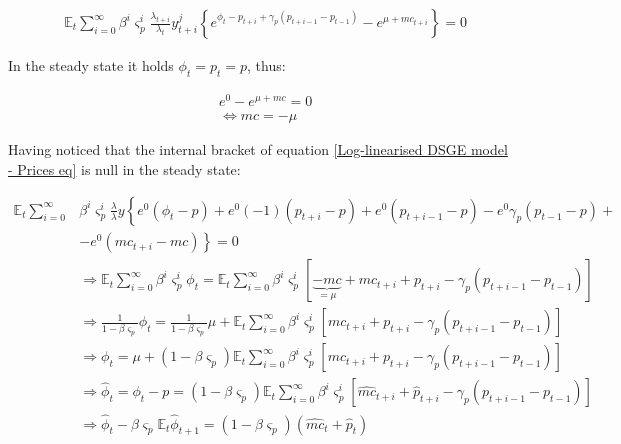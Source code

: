 \documentclass{pracamgr}
\numberwithin{equation}{section}
\begin{document}
\begin{align} \label{Log-linearised DSGE model - Prices eq}
&\mathbb{E}_{t}  \sum\limits_{i=0}^{\infty} \beta^{i} \varsigma_{p}^{i} \frac{\lambda_{t+i}}{\lambda_{t}} y_{t+i}^{j} \left\{ e^{\phi_{t} - p_{t+i} + \gamma_{p} \left(p_{t+i-1} - p_{t-1} \right) } - e^{\mu + mc_{t+i}} \right\} = 0
\end{align}

In the steady state it holds $\phi_{t} = p_{t} = p $, thus:

\begin{align}
& e^{0} - e^{\mu + mc} = 0 \nonumber \\
& \iff mc = -\mu
\end{align}

Having noticed that the internal bracket of equation \ref{Log-linearised DSGE model - Prices eq}  is null in the steady state:

\begin{align} \label{Log-linearised DSGE model - Prices eq2}
\mathbb{E}_{t}  \sum\limits_{i=0}^{\infty} &\beta^{i} \varsigma_{p}^{i} \frac{\lambda}{\lambda} y \left\{ e^{0} \left(\phi_{t} - p \right) + e^{0} (-1) \left(p_{t+i} - p \right) + e^{0} \left( p_{t+i-1} - p \right) - e^{0}\gamma_{p} \left(p_{t-1} - p \right) + \nonumber \right. \\
& \left. - e^{0} \left(mc_{t+i} - mc \right) \right\} = 0 \nonumber \\
& \Rightarrow \mathbb{E}_{t}  \sum\limits_{i=0}^{\infty} \beta^{i} \varsigma_{p}^{i} \phi_{t} = \mathbb{E}_{t}  \sum\limits_{i=0}^{\infty} \beta^{i} \varsigma_{p}^{i} \left[\underbrace{-mc}_{=\mu}  + mc_{t+i} + p_{t+i} - \gamma_{p} \left(p_{t+i-1} - p_{t-1} \right) \right] \nonumber \\
& \Rightarrow \frac{1}{1-\beta \varsigma_{p}} \phi_{t} = \frac{1}{1-\beta \varsigma_{p}} \mu + \mathbb{E}_{t}  \sum\limits_{i=0}^{\infty} \beta^{i} \varsigma_{p}^{i} \left[mc_{t+i} + p_{t+i} - \gamma_{p} \left(p_{t+i-1} - p_{t-1} \right) \right] \nonumber \\
& \Rightarrow \phi_{t} = \mu +  \left( 1-\beta \varsigma_{p} \right) \mathbb{E}_{t}  \sum\limits_{i=0}^{\infty} \beta^{i} \varsigma_{p}^{i} \left[mc_{t+i} + p_{t+i} - \gamma_{p} \left(p_{t+i-1} - p_{t-1} \right) \right] \nonumber \\
& \Rightarrow \hat{\phi}_{t} = \phi_{t} - p = \left( 1-\beta \varsigma_{p} \right) \mathbb{E}_{t}  \sum\limits_{i=0}^{\infty} \beta^{i} \varsigma_{p}^{i} \left[\hat{mc}_{t+i} + \hat{p}_{t+i} - \gamma_{p} \left(p_{t+i-1} - p_{t-1} \right) \right] \nonumber \\
& \Rightarrow \hat{\phi}_{t} - \beta \varsigma_{p} \mathbb{E}_{t}  \hat{\phi}_{t+1} = \left( 1 - \beta \varsigma_{p} \right) \left(\hat{mc}_{t} + \hat{p}_{t} \right) 
\end{align} 
\end{document}
